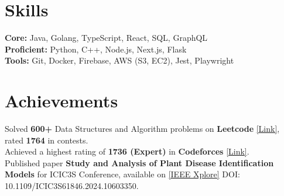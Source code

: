 \documentclass[]{Nikhil_Kadiyan_Resume}
\begin{document}

\section{Skills} 
\hrulefill


\pt \textbf{Core:} Java, Golang, TypeScript, React, SQL, GraphQL \\
\pt \textbf{Proficient:} Python, C++, Node.js, Next.js, Flask \\
\pt \textbf{Tools:} Git, Docker, Firebase, AWS (S3, EC2), Jest, Playwright \\

\sectionsep

\section{Achievements} 
\hrulefill

\pt Solved \textbf{600+} Data Structures and Algorithm problems on \textbf{Leetcode} \href{https://leetcode.com/thisidusedbysomeone/}{[Link]}, rated \textbf{1764} in contests.\\ 
\pt Achieved a highest rating of \textbf{1736 (Expert)} in \textbf{Codeforces} \href{https://codeforces.com/profile/akatsumanoka}{[Link]}.\\
\pt Published paper \textbf{Study and Analysis of Plant Disease Identification Models} for ICIC3S Conference, available on \href{https://ieeexplore.ieee.org/document/10603350}{[IEEE Xplore]} DOI: 10.1109/ICIC3S61846.2024.10603350.\\
\end{document}

